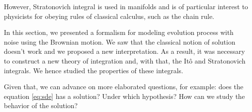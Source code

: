 However, Stratonovich integral is used in manifolds and is of particular interest to physicists for obeying rules of classical calculus, such as the chain rule.


%

%	
%
%
%
%
%
%
%
%

In this section, we presented a formalism for modeling evolution process with noise using the Brownian motion. We saw that the classical notion of solution doesn't work and we proposed a new interpretation. As a result, it was necessary to construct a new theory of integration and, with that, the Itô and Stratonovich integrals. We hence studied the properties of these integrals.

Given that, we can advance on more elaborated questions, for example: does the equation \eqref{eq:sde} has a solution? Under which hypothesis? How can we study the behavior of the solution?